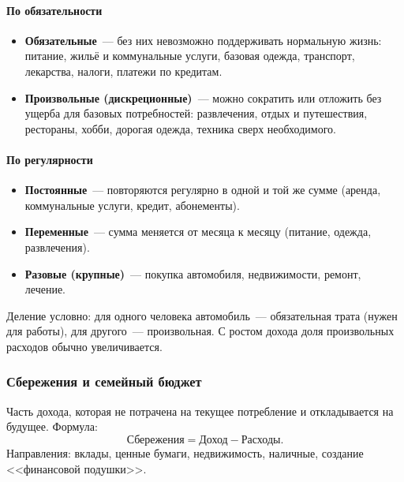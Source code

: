 \documentclass[12pt]{article}
\begin{document}
	\paragraph{По обязательности}
	\begin{itemize}
		\item \textbf{Обязательные}~--- без них невозможно поддерживать нормальную жизнь: питание, жильё и коммунальные услуги, базовая одежда, транспорт, лекарства, налоги, платежи по кредитам.
		\item \textbf{Произвольные (дискреционные)}~--- можно сократить или отложить без ущерба для базовых потребностей: развлечения, отдых и путешествия, рестораны, хобби, дорогая одежда, техника сверх необходимого.
	\end{itemize}
	
	\paragraph{По регулярности}
	\begin{itemize}
		\item \textbf{Постоянные}~--- повторяются регулярно в одной и той же сумме (аренда, коммунальные услуги, кредит, абонементы).
		\item \textbf{Переменные}~--- сумма меняется от месяца к месяцу (питание, одежда, развлечения).
		\item \textbf{Разовые (крупные)}~--- покупка автомобиля, недвижимости, ремонт, лечение.
	\end{itemize}
	
	\begin{note}
		Деление условно: для одного человека автомобиль~--- обязательная трата (нужен для работы), для другого~--- произвольная. С ростом дохода доля произвольных расходов обычно увеличивается.
	\end{note}
	
	\subsubsection{Сбережения и семейный бюджет}
	
	\begin{definition}[Сбережения]
		Часть дохода, которая не потрачена на текущее потребление и откладывается на будущее. Формула:
		\[ \text{Сбережения} = \text{Доход} - \text{Расходы}. \]
		Направления: вклады, ценные бумаги, недвижимость, наличные, создание <<финансовой подушки>>.
	\end{definition}
	
\end{document}
